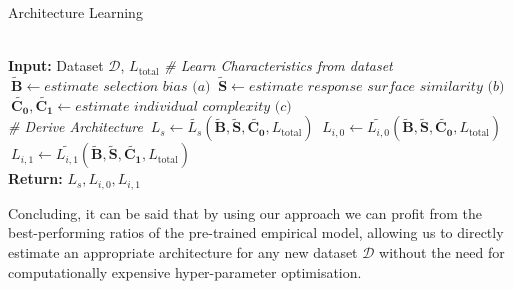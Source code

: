 \begin{algorithm}
	\caption{Architecture Learning}\label{fig:algorithm}
	\begin{algorithmic}[1]
		
		 \\
		\textbf{Input:} Dataset $\mathcal{D}$, $L_{\text{total}}$  
		\State \emph{\# Learn Characteristics from dataset}
		\State $\ \tilde{\mathbf{B}} \gets \textit{estimate selection bias (a)}$
		\State $\ \tilde{\mathbf{S}} \gets \textit{estimate response surface similarity (b)}$
		\State $\ \tilde{\mathbf{C_0}}, \tilde{\mathbf{C_1}} \gets \textit{estimate individual complexity (c)}$\\
		\State \emph{\# Derive Architecture}
		\State $\ {L_s} \gets \tilde{L_s}(\tilde{\mathbf{B}}, \tilde{\mathbf{S}}, \tilde{\mathbf{C_0}}, L_{\text{total}})$
		\State $\ {L_{i,0}}\gets \tilde{L_{i,0}}(\tilde{\mathbf{B}}, \tilde{\mathbf{S}}, \tilde{\mathbf{C_0}}, L_{\text{total}})$
		\State $\ {L_{i,1}}\gets \tilde{L_{i,1}}(\tilde{\mathbf{B}}, \tilde{\mathbf{S}}, \tilde{\mathbf{C_1}}, L_{\text{total}})$ \\
		\textbf{Return:} $L_s, L_{i,0}, L_{i,1}$ 
		
		\EndProcedure
	\end{algorithmic}
\end{algorithm}


Concluding, it can be said that by using our approach we can profit from the best-performing ratios of the pre-trained empirical model, allowing us to directly estimate an appropriate architecture for any new dataset $\mathcal{D}$ without the need for computationally expensive hyper-parameter optimisation.  
	